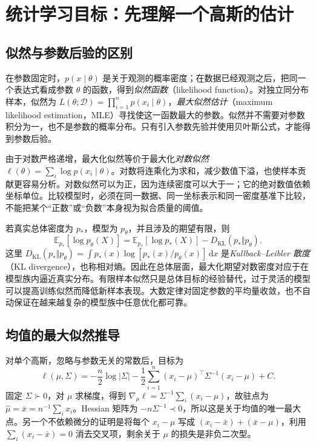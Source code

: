 \documentclass[UTF8,12pt,a4paper,fontset=fandol]{ctexart}
\begin{document}
\section{统计学习目标：先理解一个高斯的估计}
\label{sec:gmm-single-estimation}

\subsection{似然与参数后验的区别}
在参数固定时，$p(x\mid\theta)$ 是关于观测的概率密度；在数据已经观测之后，把同一个表达式看成参数 $\theta$ 的函数，得到\emph{似然函数}（likelihood function）。对独立同分布样本，似然为 $L(\theta;\mathcal D)=\prod_{i=1}^np(x_i\mid\theta)$，\emph{最大似然估计}（maximum likelihood estimation，MLE）寻找使这一函数最大的参数。似然并不需要对参数积分为一，也不是参数的概率分布。只有引入参数先验并使用贝叶斯公式，才能得到参数后验。

由于对数严格递增，最大化似然等价于最大化\emph{对数似然} $\ell(\theta)=\sum_i\log p(x_i\mid\theta)$。对数将连乘化为求和，减少数值下溢，也使样本贡献更容易分析。对数似然可以为正，因为连续密度可以大于一；它的绝对数值依赖坐标单位。比较模型时，必须在同一数据、同一坐标表示和同一密度基准下比较，不能把某个“正数”或“负数”本身视为拟合质量的阈值。

若真实总体密度为 $p_*$，模型为 $p_\theta$，并且涉及的期望有限，则
\[
\mathbb E_{p_*}[\log p_\theta(X)]
=\mathbb E_{p_*}[\log p_*(X)]-D_{\mathrm{KL}}(p_*\Vert p_\theta).
\]
这里 $D_{\mathrm{KL}}(p_*\Vert p_\theta)=\int p_*(x)\log[p_*(x)/p_\theta(x)]\,\mathrm dx$ 是\emph{Kullback--Leibler 散度}（KL divergence），也称相对熵。因此在总体层面，最大化期望对数密度对应于在模型族内逼近真实分布。有限样本似然只是总体目标的经验替代，过于灵活的模型可以提高训练似然而降低新样本表现。大数定律对固定参数的平均量收敛，也不自动保证在越来越复杂的模型族中任意优化都可靠。

\subsection{均值的最大似然推导}
对单个高斯，忽略与参数无关的常数后，目标为
\[
\ell(\mu,\Sigma)=-\frac n2\log|\Sigma|
-\frac12\sum_{i=1}^n(x_i-\mu)^\top\Sigma^{-1}(x_i-\mu)+C.
\]
固定 $\Sigma\succ0$，对 $\mu$ 求梯度，得到 $\nabla_\mu\ell=\Sigma^{-1}\sum_i(x_i-\mu)$，故驻点为 $\widehat\mu=\bar x=n^{-1}\sum_i x_i$。Hessian 矩阵为 $-n\Sigma^{-1}\prec0$，所以这是关于均值的唯一最大点。另一个不依赖微分的证明是将每个 $x_i-\mu$ 写成 $(x_i-\bar x)+(\bar x-\mu)$，利用 $\sum_i(x_i-\bar x)=0$ 消去交叉项，剩余关于 $\mu$ 的损失是非负二次型。
\end{document}
